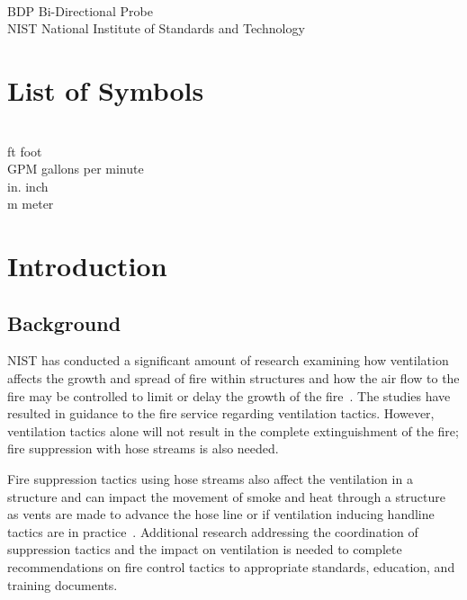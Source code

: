 \documentclass[12pt,oneside]{book}
\begin{document}
\begin{tabbing}
\hspace{1.5in} \= \\
BDP \> Bi-Directional Probe \\
NIST \> National Institute of Standards and Technology \\
\end{tabbing}

\newpage

\chapter{List of Symbols}
\begin{tabbing}
\hspace{1.5in} \= \\
ft \> foot \\
GPM \> gallons per minute \\
in. \> inch \\
m \> meter \\
\end{tabbing} 

\mainmatter


\chapter{Introduction}
\label{chap:intro}
\section{Background}
\label{sec:background}

NIST has conducted a significant amount of research examining how ventilation affects the growth and spread of fire within structures and how the air flow to the fire may be controlled to limit or delay the growth of the fire~\cite{}. The studies have resulted in guidance to the fire service regarding ventilation tactics. However, ventilation tactics alone will not result in the complete extinguishment of the fire; fire suppression with hose streams is also needed.

Fire suppression tactics using hose streams also affect the ventilation in a structure and can impact the movement of smoke and heat through a structure as vents are made to advance the hose line or if ventilation inducing handline tactics are in practice~\cite{}. Additional research addressing the coordination of suppression tactics and the impact on ventilation is needed to complete recommendations on fire control tactics to appropriate standards, education, and training documents.
\end{document}
